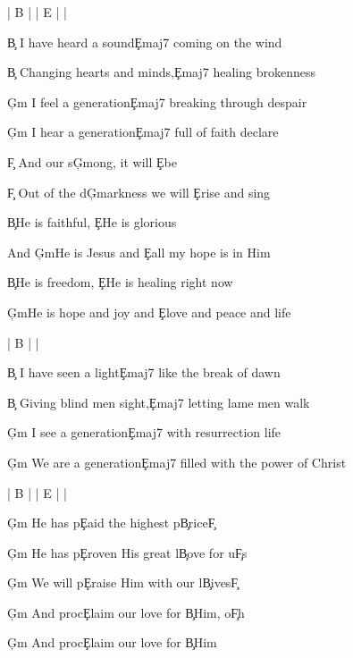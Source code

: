 \documentclass[9pt]{extarticle}
\begin{document}
\bsong

\bi
| B |  | E |  |
\ei

\bv
\c{B} I have heard a sound\c{Emaj7} coming on the wind

\c{B} Changing hearts and minds,\c{Emaj7} healing brokenness

\c{G\s m} I feel a generation\c{Emaj7} breaking through despair

\c{G\s m} I hear a generation\c{Emaj7} full of faith declare
\ev

\bp
\c{F\s } And our s\c{G\s m}ong, it will \c{E}be

\c{F\s } Out of the d\c{G\s m}arkness we will \c{E}rise and sing
\ep

\bc
\c{B}He is faithful, \c{E}He is glorious

And \c{G\s m}He is Jesus and \c{E}all my hope is in Him

\c{B}He is freedom, \c{E}He is healing right now

\c{G\s m}He is hope and joy and \c{E}love and peace and life
\ec

\bin
| B |  |
\ein

\bv
\c{B} I have seen a light\c{Emaj7} like the break of dawn

\c{B} Giving blind men sight,\c{Emaj7} letting lame men walk

\c{G\s m} I see a generation\c{Emaj7} with resurrection life

\c{G\s m} We are a generation\c{Emaj7} filled with the power of Christ
\ev



\bin
| B |  | E |  |
\ein

\bb[2]
\c{G\s m} He has p\c{E}aid the highest p\c{B}rice\c{F\s }

\c{G\s m} He has p\c{E}roven His great l\c{B}ove for u\c{F\s }s

\c{G\s m} We will p\c{E}raise Him with our l\c{B}ives\c{F\s }

\c{G\s m} And proc\c{E}laim our love for \c{B}Him, o\c{F\s }h
\eb

\bt
\c{G\s m} And proc\c{E}laim our love for \c{B}Him
\et

\esong
\end{document}
